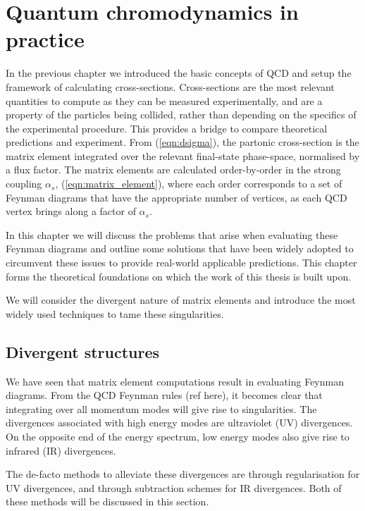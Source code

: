 \documentclass[main.tex]{subfiles}
\begin{document}
\chapter{Quantum chromodynamics in practice}
\label{chapter:qcd}
    In the previous chapter we introduced the basic concepts
    of QCD and setup the framework of calculating
    cross-sections. Cross-sections are the most relevant
    quantities to compute as they can be measured
    experimentally, and are a property of the particles
    being collided, rather than depending on the
    specifics of the experimental procedure.
    This provides a bridge to compare
    theoretical predictions and experiment.
    From (\ref{eqn:dsigma}), the partonic cross-section
    is the matrix element integrated over the relevant
    final-state phase-space, normalised by a flux factor.
    The matrix elements are
    calculated order-by-order in the strong coupling
    $\alpha_{s}$, (\ref{eqn:matrix_element}),
    where each order corresponds to a set of Feynman diagrams
    that have the appropriate number of vertices,
    as each QCD vertex brings along a factor of $\alpha_{s}$.

    In this chapter we will discuss the problems that
    arise when evaluating these Feynman diagrams and outline
    some solutions that have been widely adopted to circumvent
    these issues to provide real-world applicable predictions.
    This chapter forms the theoretical foundations on which
    the work of this thesis is built upon.

    We will consider the divergent nature of matrix
    elements and introduce the most widely used techniques
    to tame these singularities.

\section{Divergent structures}\label{sec:divergences}
    We have seen that matrix element computations
    result in evaluating Feynman diagrams. From
    the QCD Feynman rules (ref here), it becomes
    clear that integrating over all momentum modes
    will give rise to singularities. The divergences
    associated with high energy modes are ultraviolet
    (UV) divergences. On the opposite end of the energy
    spectrum, low energy modes also give rise to 
    infrared (IR) divergences.

    The de-facto methods to alleviate these
    divergences are through regularisation
    for UV divergences, and through subtraction
    schemes for IR divergences. Both of these
    methods will be discussed in this section.
\end{document}
